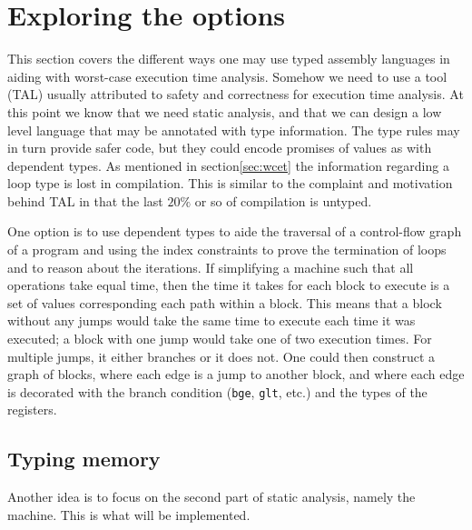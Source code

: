 \section{Exploring the options}\label{sec:options}
This section covers the different ways one may use typed assembly languages in
aiding with worst-case execution time analysis.
Somehow we need to use a tool (TAL) usually attributed to safety and
correctness for execution time analysis.
At this point we know that we need static analysis, and that we can design a
low level language that may be annotated with type information.
The type rules may in turn provide safer code, but they could encode promises
of values as with dependent types.
As mentioned in section\ref{sec:wcet} the information regarding a loop type is
lost in compilation.
This is similar to the complaint and motivation behind TAL in that the last
$20\%$\cite{tal-toplas} or so of compilation is untyped.

One option is to use dependent types to aide the traversal of a control-flow
graph of a program and using the index constraints to prove the termination of
loops and to reason about the iterations.
If simplifying a machine such that all operations take equal time, then the
time it takes for each block to execute is a set of values corresponding each
path within a block.
This means that a block without any jumps would take the same time to execute
each time it was executed; a block with one jump would take one of two
execution times.
For multiple jumps, it either branches or it does not.
One could then construct a graph of blocks, where each edge is a jump to
another block, and where each edge is decorated with the branch condition
(\texttt{bge}, \texttt{glt}, etc.) and the types of the registers.
% 
% 

\subsection{Typing memory}\label{sec:idea-mem}
Another idea is to focus on the second part of static analysis, namely the
machine. This is what will be implemented.

